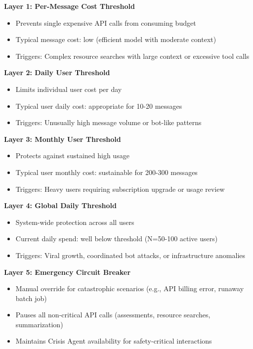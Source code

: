 \documentclass{article}
\begin{document}
\textbf{Layer 1: Per-Message Cost Threshold}
\begin{itemize}
    \item Prevents single expensive API calls from consuming budget
    \item Typical message cost: low (efficient model with moderate context)
    \item Triggers: Complex resource searches with large context or excessive tool calls
\end{itemize}

\textbf{Layer 2: Daily User Threshold}
\begin{itemize}
    \item Limits individual user cost per day
    \item Typical user daily cost: appropriate for 10-20 messages
    \item Triggers: Unusually high message volume or bot-like patterns
\end{itemize}

\textbf{Layer 3: Monthly User Threshold}
\begin{itemize}
    \item Protects against sustained high usage
    \item Typical user monthly cost: sustainable for 200-300 messages
    \item Triggers: Heavy users requiring subscription upgrade or usage review
\end{itemize}

\textbf{Layer 4: Global Daily Threshold}
\begin{itemize}
    \item System-wide protection across all users
    \item Current daily spend: well below threshold (N=50-100 active users)
    \item Triggers: Viral growth, coordinated bot attacks, or infrastructure anomalies
\end{itemize}

\textbf{Layer 5: Emergency Circuit Breaker}
\begin{itemize}
    \item Manual override for catastrophic scenarios (e.g., API billing error, runaway batch job)
    \item Pauses all non-critical API calls (assessments, resource searches, summarization)
    \item Maintains Crisis Agent availability for safety-critical interactions
\end{itemize}
\end{document}
